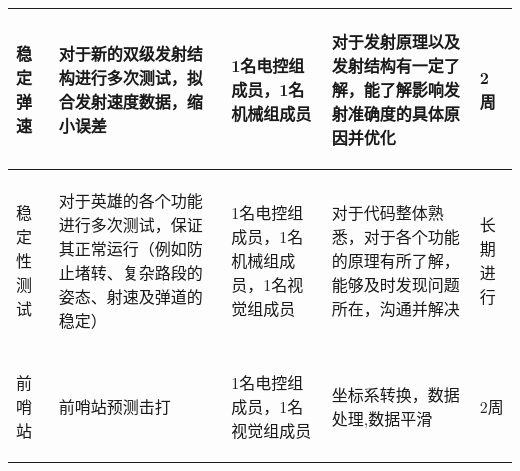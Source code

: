 \begin{longtable}{ p{2cm} | p{3cm} | p{3cm} | p{4.8cm} | p{2cm} |}
    \hline

        \begin{center}
            稳定弹速
        \end{center} &
        \begin{center}
            对于新的双级发射结构进行多次测试，拟合发射速度数据，缩小误差
        \end{center} &
        \begin{center}
            1名电控组成员，1名机械组成员
        \end{center} &
        \begin{center}
            对于发射原理以及发射结构有一定了解，能了解影响发射准确度的具体原因并优化
        \end{center} &
        \begin{center}
            2周
        \end{center} \\
        
    \hline

        \begin{center}
            稳定性测试
        \end{center} &
        \begin{center}
            对于英雄的各个功能进行多次测试，保证其正常运行（例如防止堵转、复杂路段的姿态、射速及弹道的稳定）
        \end{center} &
        \begin{center}
            1名电控组成员，1名机械组成员，1名视觉组成员
        \end{center} &
        \begin{center}
            对于代码整体熟悉，对于各个功能的原理有所了解，能够及时发现问题所在，沟通并解决
        \end{center} &
        \begin{center}
            长期进行
        \end{center} \\

    \hline

    
        \begin{center}
            前哨站
        \end{center} &
        \begin{center}
            前哨站预测击打
        \end{center} &
        \begin{center}
            1名电控组成员，1名视觉组成员
        \end{center} &
        \begin{center}
            坐标系转换，数据处理,数据平滑
        \end{center} &
        \begin{center}
            2周
        \end{center} \\


\end{longtable}
